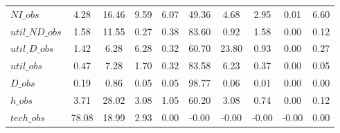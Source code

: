 \begin{center}
\begin{longtable}{lccccccccc}
$NI\_obs        $	 & 	         4.28	 & 	        16.46	 & 	         9.59	 & 	         6.07	 & 	        49.36	 & 	         4.68	 & 	         2.95	 & 	         0.01	 & 	         6.60 \\ 
$util\_ND\_obs  $	 & 	         1.58	 & 	        11.55	 & 	         0.27	 & 	         0.38	 & 	        83.60	 & 	         0.92	 & 	         1.58	 & 	         0.00	 & 	         0.12 \\ 
$util\_D\_obs   $	 & 	         1.42	 & 	         6.28	 & 	         6.28	 & 	         0.32	 & 	        60.70	 & 	        23.80	 & 	         0.93	 & 	         0.00	 & 	         0.27 \\ 
$util\_obs      $	 & 	         0.47	 & 	         7.28	 & 	         1.70	 & 	         0.32	 & 	        83.58	 & 	         6.23	 & 	         0.37	 & 	         0.00	 & 	         0.05 \\ 
$D\_obs         $	 & 	         0.19	 & 	         0.86	 & 	         0.05	 & 	         0.05	 & 	        98.77	 & 	         0.06	 & 	         0.01	 & 	         0.00	 & 	         0.00 \\ 
$h\_obs         $	 & 	         3.71	 & 	        28.02	 & 	         3.08	 & 	         1.05	 & 	        60.20	 & 	         3.08	 & 	         0.74	 & 	         0.00	 & 	         0.12 \\ 
$tech\_obs      $	 & 	        78.08	 & 	        18.99	 & 	         2.93	 & 	         0.00	 & 	        -0.00	 & 	        -0.00	 & 	        -0.00	 & 	        -0.00	 & 	         0.00 \\ 
\end{longtable}
 \end{center}
